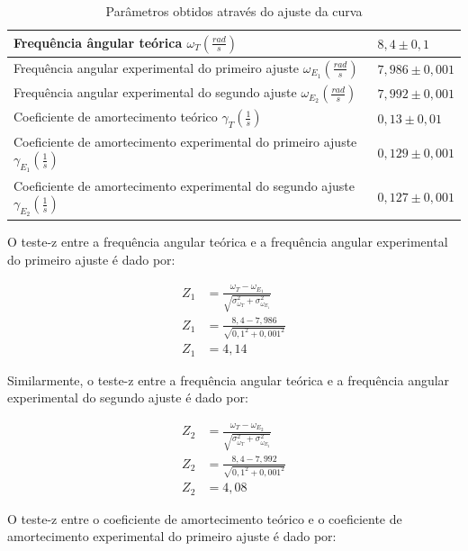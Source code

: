 \documentclass[12pt]{article}
\begin{document}
		\begin{table}[H]
			\centering
			\begin{tabular}{|l|l|}
				\hline
				Frequência ângular teórica $\omega_T (\frac{rad}{s})$ & $8,4 \pm 0,1$   \\ \hline
				Frequência angular experimental do primeiro ajuste $\omega_{E_1} (\frac{rad}{s})$ & $7,986 \pm 0,001$ \\ \hline
				Frequência angular experimental do segundo ajuste $\omega_{E_2} (\frac{rad}{s})$ & $7,992 \pm 0,001$ \\ \hline
				Coeficiente de amortecimento teórico $\gamma_T (\frac{1}{s})$ & $0,13\pm0,01$ \\ \hline
				Coeficiente de amortecimento experimental do primeiro ajuste $\gamma_{E_1} (\frac{1}{s})$ & $0,129\pm0,001$ \\ \hline
				Coeficiente de amortecimento experimental do segundo ajuste $\gamma_{E_2} (\frac{1}{s})$ & $0,127\pm0,001$ \\ \hline
			\end{tabular}
			\caption{Parâmetros obtidos através do ajuste da curva}
			\label{tab:table2}
		\end{table}
	
		O teste-z entre a frequência angular teórica e a frequência angular experimental do primeiro ajuste é dado por:
		
		\begin{align}
			Z_1 &= \frac{\omega_T - \omega_{E_1}}{\sqrt{\sigma_{\omega_T}^2+\sigma_{\omega_{E_1}}^2}} \nonumber \\
			Z_1 &= \frac{8,4 - 7,986}{\sqrt{0,1^2+0,001^2}} \nonumber \\
			Z_1 &= 4,14 \nonumber
		\end{align}
		
		Similarmente, o teste-z entre a frequência angular teórica e a frequência angular experimental do segundo ajuste é dado por:
		
		\begin{align}
			Z_2 &= \frac{\omega_T - \omega_{E_2}}{\sqrt{\sigma_{\omega_T}^2+\sigma_{\omega_{E_2}}^2}} \nonumber \\
			Z_2 &= \frac{8,4 - 7,992}{\sqrt{0,1^2+0,001^2}} \nonumber \\
			Z_2 &= 4,08 \nonumber
		\end{align}
		
		O teste-z entre o coeficiente de amortecimento teórico e o coeficiente de amortecimento experimental do primeiro ajuste é dado por:
\end{document}
